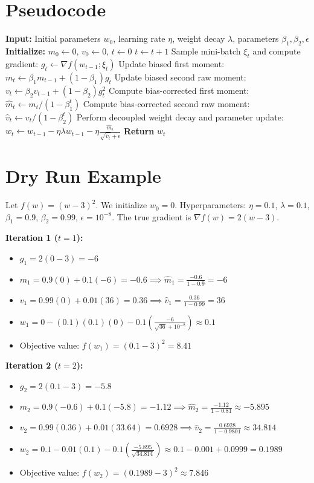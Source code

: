 \documentclass[11pt]{article}
\begin{document}
\section*{Pseudocode}
\begin{algorithm}[H]
\caption{AdamW Optimizer}
\begin{algorithmic}[1]
\State \textbf{Input:} Initial parameters $w_0$, learning rate $\eta$, weight decay $\lambda$, parameters $\beta_1, \beta_2, \epsilon$
\State \textbf{Initialize:} $m_0 \gets 0$, $v_0 \gets 0$, $t \gets 0$
    \State $t \gets t + 1$
    \State Sample mini-batch $\xi_t$ and compute gradient: $g_t \gets \nabla f(w_{t-1}; \xi_t)$
    \State Update biased first moment: $m_t \gets \beta_1 m_{t-1} + (1-\beta_1) g_t$
    \State Update biased second raw moment: $v_t \gets \beta_2 v_{t-1} + (1-\beta_2) g_t^2$
    \State Compute bias-corrected first moment: $\hat{m}_t \gets m_t / (1 - \beta_1^t)$
    \State Compute bias-corrected second raw moment: $\hat{v}_t \gets v_t / (1 - \beta_2^t)$
    \State Perform decoupled weight decay and parameter update:
    \State $w_t \gets w_{t-1} - \eta \lambda w_{t-1} - \eta \frac{\hat{m}_t}{\sqrt{\hat{v}_t} + \epsilon}$
\EndWhile
\State \textbf{Return} $w_t$
\end{algorithmic}
\end{algorithm}

\section*{Dry Run Example}
Let $f(w) = (w-3)^2$. We initialize $w_0 = 0$. 
Hyperparameters: $\eta = 0.1$, $\lambda = 0.1$, $\beta_1 = 0.9$, $\beta_2 = 0.99$, $\epsilon = 10^{-8}$.
The true gradient is $\nabla f(w) = 2(w-3)$.

\textbf{Iteration 1 ($t=1$):}
\begin{itemize}
    \item $g_1 = 2(0-3) = -6$
    \item $m_1 = 0.9(0) + 0.1(-6) = -0.6 \implies \hat{m}_1 = \frac{-0.6}{1-0.9} = -6$
    \item $v_1 = 0.99(0) + 0.01(36) = 0.36 \implies \hat{v}_1 = \frac{0.36}{1-0.99} = 36$
    \item $w_1 = 0 - (0.1)(0.1)(0) - 0.1 \left(\frac{-6}{\sqrt{36} + 10^{-8}}\right) \approx 0.1$
    \item Objective value: $f(w_1) = (0.1-3)^2 = 8.41$
\end{itemize}

\textbf{Iteration 2 ($t=2$):}
\begin{itemize}
    \item $g_2 = 2(0.1-3) = -5.8$
    \item $m_2 = 0.9(-0.6) + 0.1(-5.8) = -1.12 \implies \hat{m}_2 = \frac{-1.12}{1-0.81} \approx -5.895$
    \item $v_2 = 0.99(0.36) + 0.01(33.64) = 0.6928 \implies \hat{v}_2 = \frac{0.6928}{1-0.9801} \approx 34.814$
    \item $w_2 = 0.1 - 0.01(0.1) - 0.1 \left(\frac{-5.895}{\sqrt{34.814}}\right) \approx 0.1 - 0.001 + 0.0999 = 0.1989$
    \item Objective value: $f(w_2) = (0.1989-3)^2 \approx 7.846$
\end{itemize}
\end{document}
